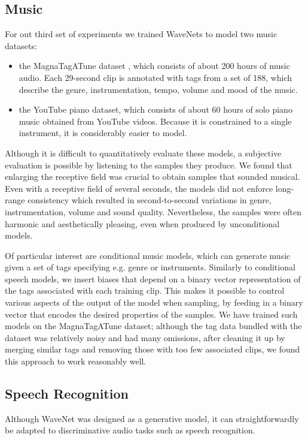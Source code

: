 \subsection{Music}

For out third set of experiments we trained WaveNets to model two music datasets:
\begin{itemize}
    \item the MagnaTagATune dataset \citep{law2009input}, which consists of about 200 hours of music audio. Each 29-second clip is annotated with tags from a set of 188, which describe the genre, instrumentation, tempo, volume and mood of the music.
    \item the YouTube piano dataset, which consists of about 60 hours of solo piano music obtained from YouTube videos. Because it is constrained to a single instrument, it is considerably easier to model.
\end{itemize}
Although it is difficult to quantitatively evaluate these models, a subjective evaluation is possible by listening to the samples they produce.
We found that enlarging the receptive field was crucial to obtain samples that sounded musical. Even with a receptive field of several seconds, the models did not enforce long-range consistency which resulted in second-to-second variations in genre, instrumentation, volume and sound quality. Nevertheless, the samples were often harmonic and aesthetically pleasing, even when produced by unconditional models.

Of particular interest are conditional music models, which can generate music given a set of tags specifying e.g. genre or instruments. Similarly to conditional speech models, we insert biases that depend on a binary vector representation of the tags associated with each training clip. This makes it possible to control various aspects of the output of the model when sampling, by feeding in a binary vector that encodes the desired properties of the samples. We have trained such models on the MagnaTagATune dataset; although the tag data bundled with the dataset was relatively noisy and had many omissions, after cleaning it up by merging similar tags and removing those with too few associated clips, we found this approach to work reasonably well.

\subsection{Speech Recognition}

Although WaveNet was designed as a generative model, it can straightforwardly be adapted to discriminative audio tasks such as speech recognition. 

